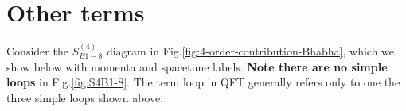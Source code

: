 \section{Other terms}
Consider the $S^{(4)}_{B1-8}$ diagram in Fig.\ref{fig:4-order-contribution-Bhabha}, which we show below with momenta and spacetime labels. \textbf{Note there are no simple loops} in Fig.\ref{fig:S4B1-8}. The term loop in QFT generally refers only to one the three simple loops shown above.
\begin{figure}[H]
    \centering
{} %
\begin{tikzpicture}[x=0.75pt,y=0.75pt,yscale=-1,xscale=1]


\end{tikzpicture}
\end{figure}
